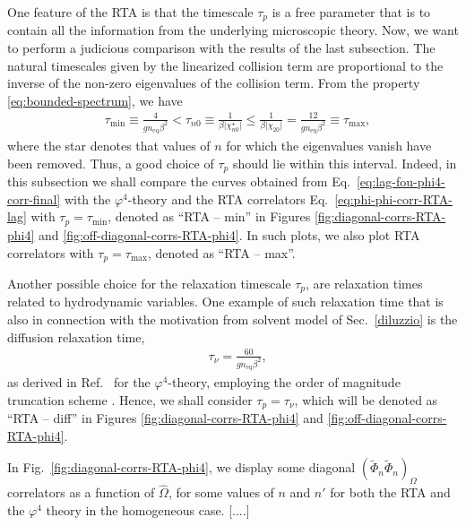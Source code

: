 \documentclass[aps,prd,preprint,nofootinbib,amsmath,amssymb,showpacs,longbibliography,singlecolumn,superscriptaddress,10pt]{revtex4-1}
\theoremstyle{plain}
\theoremstyle{definition}
\begin{document}
One feature of the RTA is that the timescale $\tau_{p}$ is a free parameter that is to contain all the information from the underlying microscopic theory. Now, we want to perform a judicious comparison with the results of the last subsection. The natural timescales given by the linearized collision term are proportional to the inverse of the non-zero eigenvalues of the collision term. From the property \eqref{eq:bounded-spectrum}, we have 
%
\begin{equation}
\begin{aligned}
&
\tau_{\mathrm{min}}
\equiv
 \frac{4}{g n_{\mathrm{eq}} \beta^{2}} < \tau_{n 0} \equiv \frac{1}{\beta \vert \chi_{n 0}^{\star} \vert} 
\leq
\frac{1}{\beta \vert \chi_{2 0} \vert}
=
 \frac{12}{g n_{\mathrm{eq}} \beta^{2}}
\equiv
\tau_{\mathrm{max}}
 ,
\end{aligned}    
\end{equation}
%
where the star denotes that values of $n$ for which the eigenvalues vanish have been removed. Thus, a good choice of $\tau_{p}$ should lie within this interval. Indeed, in this subsection we shall compare the curves obtained from Eq.~\eqref{eq:lag-fou-phi4-corr-final} with the $\varphi^{4}$-theory and the RTA correlators Eq.~\eqref{eq:phi-phi-corr-RTA-lag} with $\tau_{p} = \tau_{\mathrm{min}}$, denoted as ``RTA -- min'' in Figures \ref{fig:diagonal-corrs-RTA-phi4} and \ref{fig:off-diagonal-corrs-RTA-phi4}. In such plots, we also plot RTA correlators with $\tau_{p} = \tau_{\mathrm{max}}$, denoted as ``RTA -- max''. 

Another possible choice for the relaxation timescale $\tau_{p}$, are relaxation times related to hydrodynamic variables. One example of such relaxation time that is also in connection with the motivation from solvent model of Sec.~\ref{diluzzio} is the diffusion relaxation time, 
%
\begin{equation}
\begin{aligned}
&
\tau_{\nu} = \frac{60}{g n_{\mathrm{eq}} \beta^{2}},
\end{aligned}   
\end{equation}
%
as derived in Ref.~\cite{Rocha:2023hts} for the $\varphi^{4}$-theory, employing the order of magnitude truncation scheme \cite{Fotakis:2022usk,Wagner:2022ayd,struchtrup2004stable}. Hence, we shall consider $\tau_p = \tau_{\nu}$, which will be denoted as ``RTA -- diff'' in Figures \ref{fig:diagonal-corrs-RTA-phi4} and \ref{fig:off-diagonal-corrs-RTA-phi4}.

In Fig.~\ref{fig:diagonal-corrs-RTA-phi4}, we display some diagonal $\left( \widetilde{\Phi}_n \widetilde{\Phi}_{n}  \right)_{\Omega}$ correlators as a function of $\widehat{\Omega}$, for some values of $n$ and $n'$ for both the RTA and the $\varphi^{4}$ theory in the homogeneous case. [....]
\end{document}
